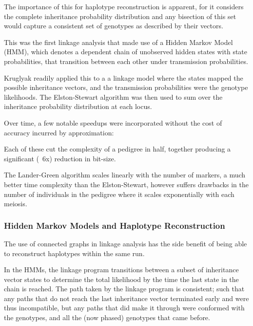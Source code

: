 The importance of this for haplotype reconstruction is apparent, for it considers the complete inheritance probability distribution and any bisection of this set would capture a consistent set of genotypes as described by their vectors.

This was the first linkage analysis that made use of a Hidden Markov Model (\gls{HMM}),  which denotes a dependent chain of unobserved hidden states with state probabilities, that transition between each other under transmission probabilities.  

Kruglyak readily applied this to a a linkage model where the states mapped the possible inheritance vectors, and the transmission probabilities were the genotype likelihoods. The Elston-Stewart algorithm was then used to sum over the inheritance probability distribution at each locus.

Over time, a few notable speedups were incorporated without the cost of accuracy incurred by approximation:

\begin{description}
\end{description}

Each of these cut the complexity of a pedigree in half, together producing a significant (~6x) reduction in bit-size.

The Lander-Green algorithm scales linearly with the number of markers, a much better time complexity than the Elston-Stewart, however suffers drawbacks in the number of individuals in the pedigree where it scales exponentially with each meiosis.


\subsubsection{Hidden Markov Models and Haplotype Reconstruction}

The use of connected graphs in linkage analysis has the side benefit of being able to reconstruct haplotypes within the same run.

In the HMMs, the linkage program transitions between a subset of inheritance vector states to determine the total likelihood by the time the last state in the chain is reached. The path taken by the linkage program is consistent; such that any paths that do not reach the last inheritance vector terminated early and were thus incompatible, but any paths that did make it through were conformed with the genotypes, and all the (now phased) genotypes that came before.

